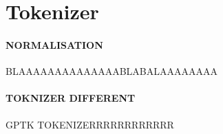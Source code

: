 \chapter{Tokenizer}

\subsubsection*{NORMALISATION} 
BLAAAAAAAAAAAAAABLABALAAAAAAAA

\subsubsection*{TOKNIZER DIFFERENT}
GPTK TOKENIZERRRRRRRRRRRR

